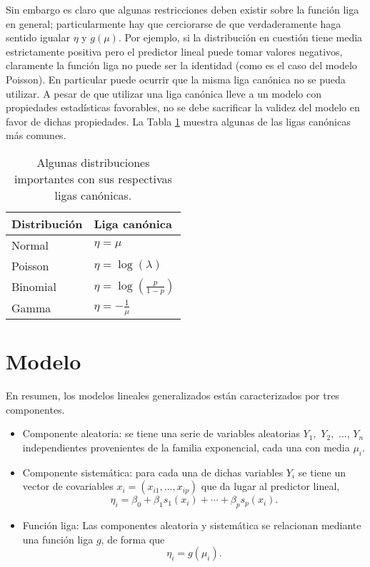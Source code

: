 Sin embargo es claro que algunas restricciones deben existir sobre la función liga en general; particularmente hay que cerciorarse de que verdaderamente haga sentido igualar $\eta$ y $g(\mu)$. Por ejemplo, si la distribución en cuestión tiene media estrictamente positiva pero el predictor lineal puede tomar valores negativos, claramente la función liga no puede ser la identidad (como es el caso del modelo Poisson). En particular puede ocurrir que la misma liga canónica no se pueda utilizar. A pesar de que utilizar una liga canónica lleve a un modelo con propiedades estadísticas favorables, no se debe sacrificar la validez del modelo en favor de dichas propiedades. La Tabla \ref{tabla:ligas_canonicas} muestra algunas de las ligas canónicas más comunes. \\


\begin{table}[h]
\centering
\begin{tabular}{l|l}
Distribución & Liga canónica                             \\ \hline
Normal       & $\eta = \mu$                              \\
Poisson      & $\eta = \log( \lambda )$                  \\
Binomial     & $\eta = \log\left( \frac{p}{1-p} \right)$ \\
Gamma        & $\eta = -\frac{1}{\mu}$                   
\end{tabular}
\caption{Algunas distribuciones importantes con sus respectivas ligas canónicas.} \label{tabla:ligas_canonicas}
\end{table}


\section{Modelo}

En resumen, los modelos lineales generalizados están caracterizados por tres componentes.
\begin{itemize}
\item Componente aleatoria: se tiene una serie de variables aleatorias $Y_1,$ $Y_2,$ ..., $Y_n$ independientes provenientes de la familia exponencial, cada una con media $\mu_i$.
\item Componente sistemática: para cada una de dichas variables $Y_i$ se tiene un vector de covariables $x_i = (x_{i1}, ..., x_{ip})$ que da lugar al predictor lineal,
\begin{equation*}
	\eta_i = \beta_0 + \beta_1 s_1(x_i) + \cdots + \beta_p s_p(x_i).
\end{equation*}
\item Función liga: Las componentes aleatoria y sistemática se relacionan mediante una función liga $g$, de forma que
\begin{equation*}
	\eta_i = g(\mu_i).
\end{equation*}
\end{itemize}


